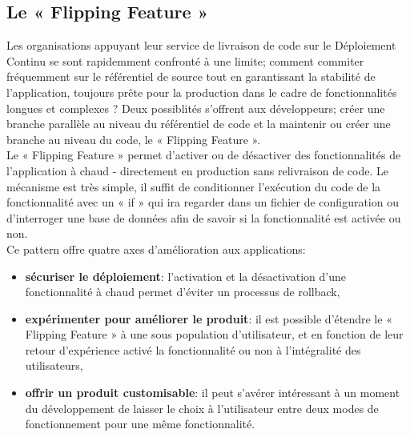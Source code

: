       \subsection{Le « Flipping Feature »}
      Les organisations appuyant leur service de livraison de code sur le Déploiement Continu se sont rapidemment confronté à une limite; comment commiter fréquemment sur le référentiel de source tout en garantissant la stabilité de l’application, toujours prête pour la production dans le cadre de fonctionnalités longues et complexes ? Deux possiblités s'offrent aux développeurs; créer une branche parallèle au niveau du référentiel de code et la maintenir ou créer une branche au niveau du code, le « Flipping Feature ».\\
      Le « Flipping Feature » permet d'activer ou de désactiver des fonctionnalités de l'application à chaud - directement en production sans relivraison de code. Le mécanisme est très simple, il suffit de conditionner l'exécution du code de la fonctionnalité avec un « if » qui ira regarder dans un fichier de configuration ou d'interroger une base de données afin de savoir si la fonctionnalité est activée ou non.\\
      Ce pattern offre quatre axes d'amélioration aux applications:\\
      \begin{itemize}
        \item \textbf{sécuriser le déploiement}: l'activation et la désactivation d'une fonctionnalité à chaud permet d'éviter un processus de rollback,
        \item \textbf{expérimenter pour améliorer le produit}: il est possible d'étendre le « Flipping Feature » à une sous population d'utilisateur, et en fonction de leur retour d'expérience activé la fonctionnalité ou non à l'intégralité des utilisateurs,
        \item \textbf{offrir un produit customisable}: il peut s'avérer intéressant à un moment du développement de laisser le choix à l'utilisateur entre deux modes de fonctionnement pour une même fonctionnalité.\\
      \end{itemize}
